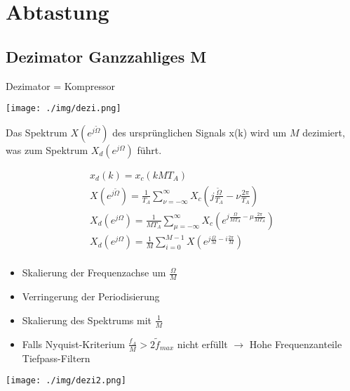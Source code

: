 \documentclass[10pt,a4paper]{article}
\begin{document}
\section{Abtastung}
\subsection{Dezimator Ganzzahliges M}
Dezimator = Kompressor 
  \begin{center}
      \texttt{[image: ./img/dezi.png]}
  \end{center}
Das Spektrum $X(e^{j\tilde{\Omega}})$ des ursprünglichen Signals x(k) wird um $M$ dezimiert,
was zum Spektrum $X_d(e^{j\Omega})$ führt.
  \begin{mdframed}[style=exercise]
    \begin{align}
        x_d(k)=x_c(kMT_A)\\
        X(e^{j\tilde{\Omega}})=\frac{1}{T_A}\sum_{\nu=-\infty}^{\infty} X_c(j\frac{\tilde{\Omega}}{T_A} -\nu\frac{2\pi}{T_A})\\
        X_d(e^{j\Omega})=\frac{1}{MT_A}\sum_{\mu=-\infty}^{\infty} X_c(e^{j\frac{\Omega}{MT_A} -\mu\frac{2\pi}{MT_A}})\\
        X_d(e^{j\Omega})=\frac{1}{M}\sum_{i=0}^{M-1} X(e^{j\frac{\Omega}{M} -i\frac{2\pi}{M}})\\
    \end{align}
  \end{mdframed}
  \begin{itemize}
    \item Skalierung der Frequenzachse um $\frac{\Omega}{M}$
    \item Verringerung der Periodisierung
    \item Skalierung des Spektrums mit $\frac{1}{M}$
    \item Falls Nyquist-Kriterium $\frac{f_A}{M}>2\tilde{f}_{max}$ nicht erfüllt $\rightarrow$ Hohe Frequenzanteile Tiefpass-Filtern 
  \end{itemize}
  \begin{center}
      \texttt{[image: ./img/dezi2.png]}
  \end{center}
\end{document}
